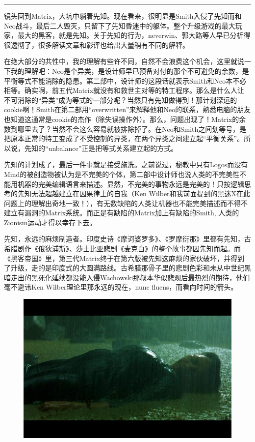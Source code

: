 \documentclass[UTF8]{ctexart}
\newcommand{\myparsep}{\noindent \rule[0.5ex]{\linewidth}{1pt}}
\begin{document}
\myparsep

镜头回到Matrix，大坑中躺着先知。现在看来，很明显是Smith入侵了先知而和Neo战斗，最后二人毁灭，只留下了先知昏迷中的躯体。整个升级游戏的最大玩家，最大的黑客，就是先知。关于先知的行为，neverwin、郭大路等人早已分析得很透彻了，很多解读文章和影评也给出大量稍有不同的解释。

在绝大部分的共性中，我的理解有些许不同，自然不会浪费这个机会，这里就说一下我的理解吧：Neo是个异类，是设计师早已预备对付的那个不可避免的余数，是平衡等式不能消除的隐患。第二部中，设计师的这段话就表示Smith和Neo本不必相等。确实啊，前五代Matrix就没有和救世主对等的特工程序。那么是什么人让不可消除的“异类”成为等式的一部分呢？当然只有先知做得到！那计划深远的cookie啊！Smith在第二部用“overwritten”来解释他和Neo的联系，熟悉电脑的朋友也知道这通常是cookie的杰作（除失误操作外）。那么，问题出现了！Matrix的余数到哪里去了？当然不会这么容易就被排除掉了。在Neo和Smith之间划等号，是把原本正常的特工变成了不受控制的异类，在两个异类之间建立起“平衡关系”。所以说，先知的“unbalance”正是把等式关系建立起的方式。

先知的计划成了，最后一件事就是接受施洗。之前说过，秘教中只有Logos而没有Mind的被创造物被认为是不完美的个体，第二部中设计师也说人类的不完美性不能用机器的完美编辑语言来描述。显然，不完美的事物永远是完美的！只按逻辑思考的先知无法超越建立在因果律上的自我（Ken Wilber和我前面提到的黑迷X在此问题上的理解出奇地一致！），有无数缺陷的人类让机器也不能完美描述而不得不建立有漏洞的Matrix系统。而正是有缺陷的Matrix加上有缺陷的Smith, 人类的Zionism运动才得以幸存下去。

先知，永远的麻烦制造者。印度史诗《摩诃婆罗多》、《罗摩衍那》里都有先知，古希腊剧作《俄狄浦斯》、莎士比亚悲剧《麦克白》的整个故事都因先知而起。而《黑客帝国》里，第三代Matrix终于在第六版被先知这麻烦的家伙破坏，并得到了升级，走的是印度式的大圆满路线。古希腊那骨子里的悲剧色彩和未从中世纪黑暗走出的黑死化延续都没能入侵Wachowski那叔本华似悲观后最热烈的期待，他们毫不避讳Ken Wilber理论里那永远的现在，nunc fluens，而看向时间的箭头。

\begin{figure}[htb]
\centering
\includegraphics[width=0.5\linewidth]{fig/222742a973b84df81f17a262.jpg}
\end{figure}
\end{document}
